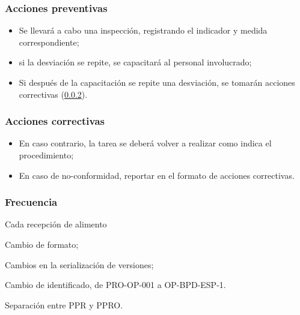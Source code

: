\subsubsection{Acciones preventivas}

\begin{itemize}
	\item Se llevará a cabo una inspección, registrando el indicador y medida correspondiente;
	\item si la desviación se repite, se capacitará al personal involucrado;
	\item Si después de la capacitación se repite una desviación, se tomarán acciones correctivas (\cref{sec:2.1:acc}).
\end{itemize}

\subsubsection{Acciones correctivas}
\label{sec:2.1:acc}
\begin{itemize}
	\item En caso contrario, la tarea se deberá volver a realizar como indica el procedimiento;
	\item En caso de no-conformidad, reportar en el formato de acciones correctivas.
\end{itemize}

\subsubsection{Frecuencia}

Cada recepción de \gls{alimento}

\begin{changelog}[simple, sectioncmd=\subsection*,label=changelog-1.2]
	\begin{version}[v=2.1, date=2023--01, author=Pablo E. Alanis]
		\item Cambio de formato;
		\item Cambios en la serialización de versiones;
		\item Cambio de identificado, de PRO-OP-001 a OP-BPD-ESP-1.
		\item Separación entre PPR y PPRO.
	\end{version}
\end{changelog}